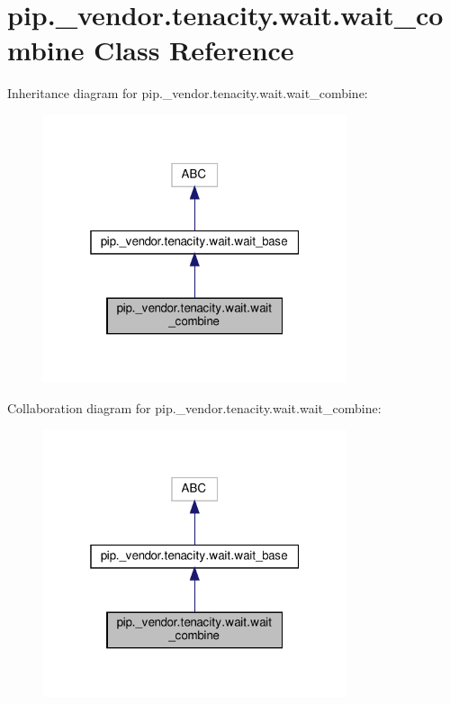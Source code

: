 \hypertarget{classpip_1_1__vendor_1_1tenacity_1_1wait_1_1wait__combine}{}\section{pip.\+\_\+vendor.\+tenacity.\+wait.\+wait\+\_\+combine Class Reference}
\label{classpip_1_1__vendor_1_1tenacity_1_1wait_1_1wait__combine}


Inheritance diagram for pip.\+\_\+vendor.\+tenacity.\+wait.\+wait\+\_\+combine\+:
\nopagebreak
\begin{figure}[H]
\begin{center}
\leavevmode
\includegraphics[width=253pt]{classpip_1_1__vendor_1_1tenacity_1_1wait_1_1wait__combine__inherit__graph}
\end{center}
\end{figure}


Collaboration diagram for pip.\+\_\+vendor.\+tenacity.\+wait.\+wait\+\_\+combine\+:
\nopagebreak
\begin{figure}[H]
\begin{center}
\leavevmode
\includegraphics[width=253pt]{classpip_1_1__vendor_1_1tenacity_1_1wait_1_1wait__combine__coll__graph}
\end{center}
\end{figure}
